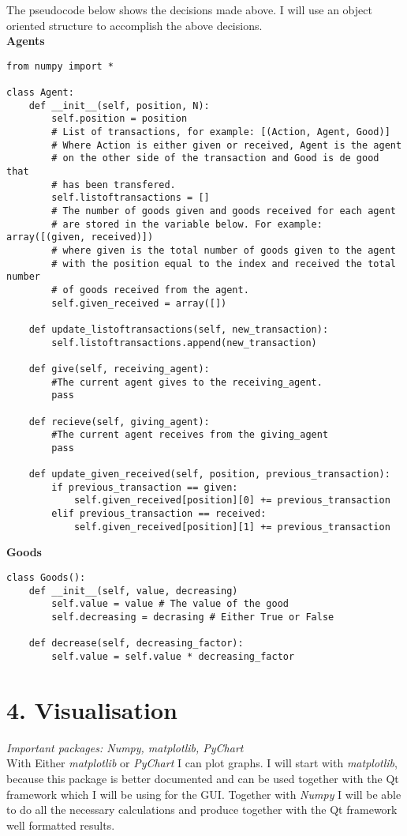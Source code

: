 \documentclass{article}
\begin{document}
The pseudocode below shows the decisions made above. I will use an object oriented structure to accomplish the above decisions.
\\
\textbf{Agents}
\begin{lstlisting}
from numpy import *

class Agent:
	def __init__(self, position, N):
		self.position = position
		# List of transactions, for example: [(Action, Agent, Good)] 
		# Where Action is either given or received, Agent is the agent 
		# on the other side of the transaction and Good is de good that
		# has been transfered.
		self.listoftransactions = []
		# The number of goods given and goods received for each agent
		# are stored in the variable below. For example: array([(given, received)])
		# where given is the total number of goods given to the agent 
		# with the position equal to the index and received the total number
		# of goods received from the agent.
		self.given_received = array([])
	
	def update_listoftransactions(self, new_transaction):
		self.listoftransactions.append(new_transaction)

	def give(self, receiving_agent):
		#The current agent gives to the receiving_agent.
		pass
	
	def recieve(self, giving_agent):
		#The current agent receives from the giving_agent
		pass
	
	def update_given_received(self, position, previous_transaction):
		if previous_transaction == given:
			self.given_received[position][0] += previous_transaction
		elif previous_transaction == received:
			self.given_received[position][1] += previous_transaction

\end{lstlisting}
\textbf{Goods}
\begin{lstlisting}
class Goods():
	def __init__(self, value, decreasing)
		self.value = value # The value of the good
		self.decreasing = decrasing # Either True or False

	def decrease(self, decreasing_factor):
		self.value = self.value * decreasing_factor
\end{lstlisting}

\section{4. Visualisation}
\textit{Important packages: Numpy, matplotlib, PyChart}
\\
With Either \textit{matplotlib} or \textit{PyChart} I can plot graphs. I will start with \textit{matplotlib}, because this package is better documented and can be used together with the Qt framework which I will be using for the GUI. Together with \textit{Numpy} I will be able to do all the necessary calculations and produce together with the Qt framework well formatted results.
\end{document}
